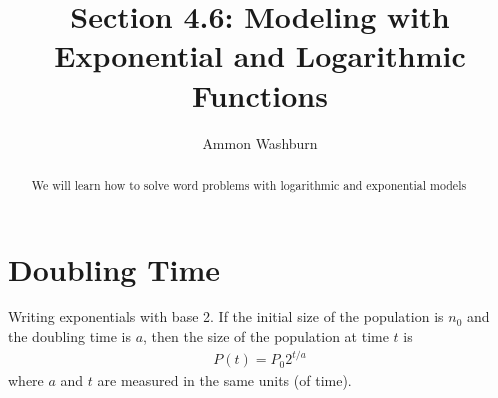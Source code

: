 \documentclass{tufte-handout}
\title{Section 4.6: Modeling with Exponential and Logarithmic Functions}
\author[AW]{Ammon Washburn}
\begin{document}
\maketitle

\begin{abstract}
We will learn how to solve word problems with logarithmic and exponential models
\end{abstract}


\section{Doubling Time}
Writing exponentials with base 2.
If the initial size of the population is $n_0$ and the doubling time is $a$, then the size of the population at time $t$ is
\begin{align*}
P(t) = P_0 2^{t/a}
\end{align*}
where $a$ and $t$ are measured in the same units (of time).
\end{document}
